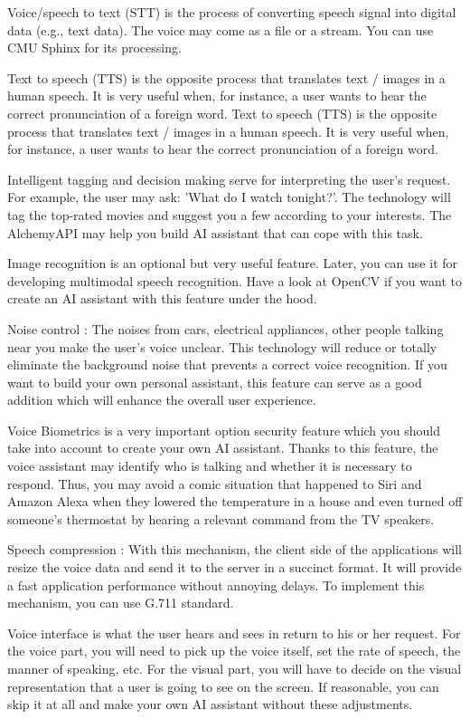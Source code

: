 \documentclass[12pt,a4paper]{article}
\begin{document}
Voice/speech to text (STT) is the process of converting speech signal into digital data (e.g., text data). The voice may come as a file or a stream. You can use CMU Sphinx for its processing.

Text to speech (TTS)
is the opposite process that translates text / images in a human speech. It is very useful when, for instance, a user wants to hear the correct pronunciation of a foreign word.
Text to speech (TTS) is the opposite process that translates text / images in a human speech. It is very useful when, for instance, a user wants to hear the correct pronunciation of a foreign word.

Intelligent tagging and decision making serve for interpreting the user's request. For example, the user may ask: 'What do I watch tonight?'. The technology will tag the top-rated movies and suggest you a few according to your interests. The AlchemyAPI may help you build AI assistant that can cope with this task. 

Image recognition is an optional but very useful feature. Later, you can use it for developing multimodal speech recognition. Have a look at OpenCV if you want to create an AI assistant with this feature under the hood.

Noise control :
The noises from cars, electrical appliances, other people talking near you make the user's voice unclear. This technology will reduce or totally eliminate the background noise that prevents a correct voice recognition. If you want to build your own personal assistant, this feature can serve as a good addition which will enhance the overall user experience. 

Voice Biometrics is a very important option security feature which you should take into account to create your own AI assistant. Thanks to this feature, the voice assistant may identify who is talking and whether it is necessary to respond. Thus, you may avoid a comic situation that happened to Siri and Amazon Alexa when they lowered the temperature in a house and even turned off someone's thermostat by hearing a relevant command from the TV speakers.

Speech compression :
With this mechanism, the client side of the applications will resize the voice data and send it to the server in a succinct format. It will provide a fast application performance without annoying delays. To implement this mechanism, you can use G.711 standard.

Voice interface is what the user hears and sees in return to his or her request. For the voice part, you will need to pick up the voice itself, set the rate of speech, the manner of speaking, etc. For the visual part, you will have to decide on the visual representation that a user is going to see on the screen. If reasonable, you can skip it at all and make your own AI assistant without these adjustments.
\end{document}
